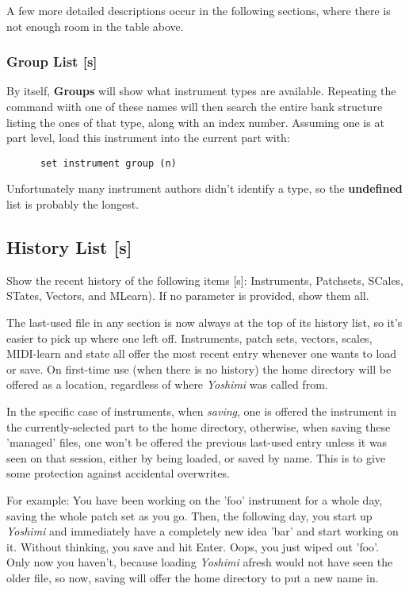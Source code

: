 A few more detailed descriptions occur in the following sections, where there
is not enough room in the table above.

\subsubsection{Group List [s]}
\label{subsec:command_line_instrument_group_list}
   By itself, \textbf{Groups} will show what instrument types are available.
   Repeating the command wiith one of these names will then search the entire
   bank structure listing the ones of that type, along with an index number.
   Assuming one is at part level, load this instrument into the current part with:
   \begin{verbatim}
      set instrument group (n)
   \end{verbatim}

   Unfortunately many instrument authors didn't identify a type, so the
   \textbf{undefined} list is probably the longest.

\subsection{History List [s]}
\label{subsec:command_line_list_history}

   Show the recent history of the following items [s]:
   Instruments, Patchsets, SCales, STates, Vectors, and MLearn).
   If no parameter is provided, show them all.

   The last-used file in any section is now always at the top of its history list,
   so it's easier to pick up where one left off.
   Instruments, patch sets, vectors, scales, MIDI-learn and state all offer the
   most recent entry whenever one wants to load or save.  On first-time use (when
   there is no history) the home directory will be offered as a location,
   regardless of where \textsl{Yoshimi} was called from.

   In the specific case of instruments, when \textsl{saving},
   one is offered the instrument in the currently-selected part to the home
   directory, otherwise, when saving these 'managed' files,
   one won't be offered the previous last-used entry unless it was seen on that
   session, either by being loaded, or saved by name. This is to give some
   protection against accidental overwrites.

   For example:
   You have been working on the 'foo' instrument
   for a whole day, saving the whole patch set as you
   go. Then, the following day, you start up \textsl{Yoshimi}
   and immediately have a completely
   new idea 'bar' and start working on it. Without thinking, you save and hit
   Enter. Oops, you just wiped out 'foo'.
   Only now you haven't, because loading \textsl{Yoshimi}
   afresh would not have seen the older file, so now, saving
   will offer the home directory to put a new name in.

